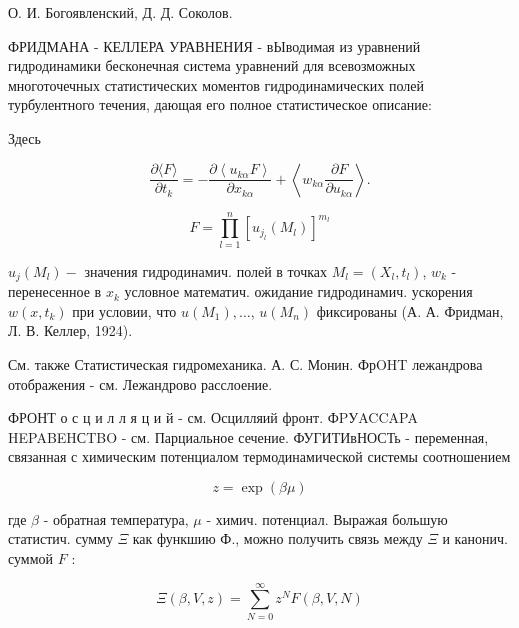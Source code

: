 \documentclass[10pt]{article}
\begin{document}
О. И. Богоявленский, Д. Д. Соколов.



ФРИДМАНА - КЕЛЛЕРА УРАВНЕНИЯ - вЫводимая из уравнений гидродинамики бесконечная система уравнений для всевозможных многоточечных статистических моментов гидродинамических полей турбулентного течения, дающая его полное статистическое описание:



Здесь



\[

\frac{\partial\langle F\rangle}{\partial t_{k}}=-\frac{\partial\left\langle u_{k \alpha} F\right\rangle}{\partial x_{k \alpha}}+\left\langle w_{k \alpha} \frac{\partial F}{\partial u_{k \alpha}}\right\rangle .

\]



\[

F=\prod_{l=1}^{n}\left[u_{j_{l}}\left(M_{l}\right)\right]^{m_{l}}

\]



$u_{j}\left(M_{l}\right)-$ значения гидродинамич. полей в точках $M_{l}=\left(X_{l}, t_{l}\right)$, $w_{k}$ - перенесенное в $x_{k}$ условное математич. ожидание гидродинамич. ускорения $w\left(x, t_{k}\right)$ при условии, что $u\left(M_{1}\right), \ldots$, $u\left(M_{n}\right)$ фиксированы (А. А. Фридман, Л. В. Келлер, 1924).



См. также Статистическая гидромеханика. А. С. Монин. ФрOHT лежандрова отображения - см. Лежандрово расслоение.



ФРОНТ о с ц и л л я ц и й - см. Осцилляий фронт. ФPУACCAPA HEPABEHСTBO - см. Парциальное сечение. ФУГИТИвНОСТь - переменная, связанная с химическим потенциалом термодинамической системы соотношением



\[

z=\exp (\beta \mu)

\]



где $\beta$ - обратная температура, $\mu$ - химич. потенциал. Выражая большую статистич. сумму $\Xi$ как функшию Ф., можно получить связь между $\Xi$ и канонич. суммой $F$ :



\[

\Xi(\beta, V, z)=\sum_{N=0}^{\infty} z^{N} F(\beta, V, N)

\]
\end{document}
